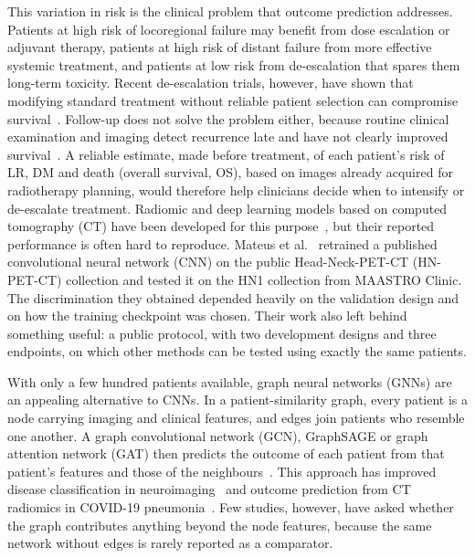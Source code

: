\documentclass[pdflatex,iicol,sn-nature]{sn-jnl}
\begin{document}
This variation in risk is the clinical problem that outcome prediction addresses. Patients at high risk of locoregional failure may benefit from dose escalation or adjuvant therapy, patients at high risk of distant failure from more effective systemic treatment, and patients at low risk from de-escalation that spares them long-term toxicity. Recent de-escalation trials, however, have shown that modifying standard treatment without reliable patient selection can compromise survival~\cite{beddok2025proton}. Follow-up does not solve the problem either, because routine clinical examination and imaging detect recurrence late and have not clearly improved survival~\cite{diezfraile2022relapse}. A reliable estimate, made before treatment, of each patient's risk of LR, DM and death (overall survival, OS), based on images already acquired for radiotherapy planning, would therefore help clinicians decide when to intensify or de-escalate treatment. Radiomic and deep learning models based on computed tomography (CT) have been developed for this purpose~\cite{aerts2014,vallieres2017,diamant2019,kazmierski2023}, but their reported performance is often hard to reproduce. Mateus et al.~\cite{mateus2023} retrained a published convolutional neural network (CNN) on the public Head-Neck-PET-CT (HN-PET-CT) collection and tested it on the HN1 collection from MAASTRO Clinic. The discrimination they obtained depended heavily on the validation design and on how the training checkpoint was chosen. Their work also left behind something useful: a public protocol, with two development designs and three endpoints, on which other methods can be tested using exactly the same patients.

With only a few hundred patients available, graph neural networks (GNNs) are an appealing alternative to CNNs. In a patient-similarity graph, every patient is a node carrying imaging and clinical features, and edges join patients who resemble one another. A graph convolutional network (GCN), GraphSAGE or graph attention network (GAT) then predicts the outcome of each patient from that patient's features and those of the neighbours~\cite{parisot2018population,kipf2017gcn,hamilton2017graphsage,velickovic2018gat}. This approach has improved disease classification in neuroimaging~\cite{parisot2018population} and outcome prediction from CT radiomics in COVID-19 pneumonia~\cite{keicher2023covid}. Few studies, however, have asked whether the graph contributes anything beyond the node features, because the same network without edges is rarely reported as a comparator.
\end{document}
